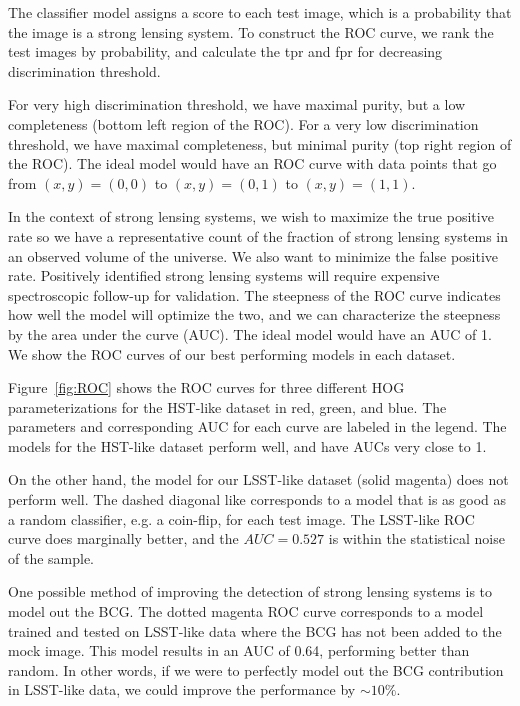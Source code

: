\documentclass{emulateapj}
\begin{document}
The classifier model assigns a score to each test image, which is a
probability that the image is a strong lensing system.  To construct
the ROC curve, we rank the test images by probability, and calculate
the tpr and fpr for decreasing discrimination threshold.

For very high discrimination threshold, we have maximal purity, but a
low completeness (bottom left region of the ROC).  For a very low
discrimination threshold, we have maximal completeness, but minimal
purity (top right region of the ROC).  The ideal model would have an
ROC curve with data points that go from $(x, y) = (0, 0)$ to $(x, y) =
(0, 1)$ to $(x, y) = (1, 1)$.

In the context of strong lensing systems, we wish to maximize the true
positive rate so we have a representative count of the fraction of
strong lensing systems in an observed volume of the universe.  We also
want to minimize the false positive rate.  Positively identified
strong lensing systems will require expensive spectroscopic follow-up
for validation.  The steepness of the ROC curve indicates how well the
model will optimize the two, and we can characterize the steepness by
the area under the curve (AUC).  The ideal model would have an AUC of
1.  We show the ROC curves of our best performing models in each
dataset.

Figure~\ref{fig:ROC} shows the ROC curves for three different HOG
parameterizations for the HST-like dataset in red, green, and blue.
The parameters and corresponding AUC for each curve are labeled in the
legend.  The models for the HST-like dataset perform well, and have
AUCs very close to 1.  

On the other hand, the model for our LSST-like dataset (solid magenta)
does not perform well.  The dashed diagonal like corresponds to a
model that is as good as a random classifier, e.g. a coin-flip, for
each test image.  The LSST-like ROC curve does marginally better, and
the $AUC=0.527$ is within the statistical noise of the sample.  

One possible method of improving the detection of strong lensing
systems is to model out the BCG.  The dotted magenta ROC curve
corresponds to a model trained and tested on LSST-like data where the
BCG has not been added to the mock image.  This model results in an
AUC of 0.64, performing better than random.  In other words, if we
were to perfectly model out the BCG contribution in LSST-like data, we
could improve the performance by $\sim10\%$.
\end{document}
